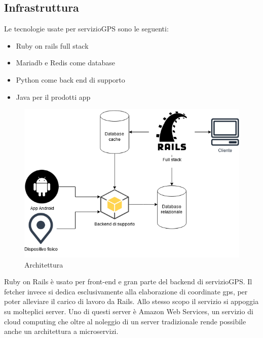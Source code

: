 \documentclass[12pt]{article}
\begin{document}
\subsection{Infrastruttura}
Le tecnologie usate per servizioGPS sono le seguenti:
\begin{itemize}
  \item Ruby on rails full stack
  \item Mariadb e Redis come database
  \item Python come back end di supporto
  \item Java per il prodotti app 
\end{itemize}
\begin{figure}[h]
\includegraphics[scale = 0.6]{infrastructure.png}
\caption{Architettura}
\label{fig:mesh1}
\end{figure}
Ruby on Rails è usato per front-end e gran parte del backend di servizioGPS. 
Il fetcher invece si dedica esclusivamente alla elaborazione di coordinate gps,
per poter alleviare il carico di lavoro da Rails.
Allo stesso scopo il servizio si appoggia su molteplici server.
Uno di questi server è Amazon Web Services, un servizio di cloud computing 
che oltre al noleggio di un server tradizionale rende possibile 
anche un architettura a microservizi. 
\end{document}
